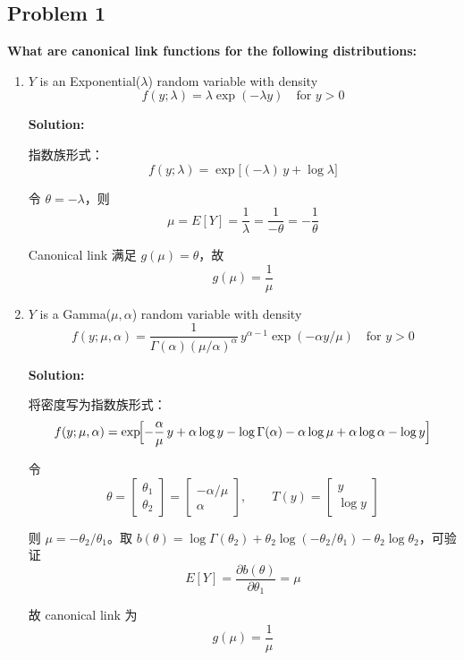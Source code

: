 \subsection{Problem 1}

\textbf{What are canonical link functions for the following distributions:}

\begin{enumerate}
\item[(a)] $Y$ is an Exponential($\lambda$) random variable with density
\[
f(y;\lambda) = \lambda\exp(-\lambda y) \quad \text{for } y > 0
\]

\textbf{Solution:}

指数族形式：
\[
f(y;\lambda) = \exp\bigl[(-\lambda)\, y + \log\lambda\bigr]
\]

令 $\theta = -\lambda$，则
\[
\mu = E[Y] = \frac{1}{\lambda} = \frac{1}{-\theta} = -\frac{1}{\theta}
\]

Canonical link 满足 $g(\mu) = \theta$，故
\[
\boxed{g(\mu) = \frac{1}{\mu}}
\]

\bigskip

\item[(b)] $Y$ is a Gamma($\mu,\alpha$) random variable with density
\[
f(y;\mu,\alpha) = \frac{1}{\Gamma(\alpha)(\mu/\alpha)^\alpha}\, y^{\alpha-1}\exp(-\alpha y/\mu) \quad \text{for } y > 0
\]

\textbf{Solution:}

将密度写为指数族形式：
\[
f(y;\mu,\alpha) = \exp\!\Bigl[-\frac{\alpha}{\mu}\,y + \alpha\log y - \log\Gamma(\alpha) - \alpha\log\mu + \alpha\log\alpha - \log y\Bigr]
\]

令
\[
\theta = \begin{bmatrix}\theta_1 \\ \theta_2\end{bmatrix} = \begin{bmatrix}-\alpha/\mu \\ \alpha\end{bmatrix}, \qquad T(y) = \begin{bmatrix}y \\ \log y\end{bmatrix}
\]

则 $\mu = -\theta_2/\theta_1$。取 $b(\theta) = \log\Gamma(\theta_2) + \theta_2\log(-\theta_2/\theta_1) - \theta_2\log\theta_2$，可验证
\[
E[Y] = \frac{\partial b(\theta)}{\partial \theta_1} = \mu
\]

故 canonical link 为
\[
\boxed{g(\mu) = \frac{1}{\mu}}
\]

\end{enumerate}

